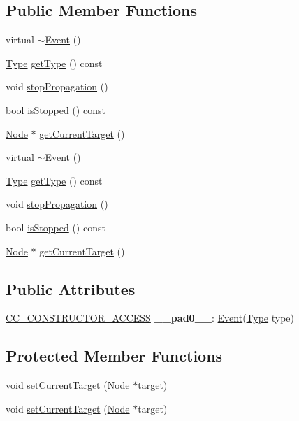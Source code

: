 \subsection*{Public Member Functions}
\begin{DoxyCompactItemize}
\item 
virtual \hyperlink{classEvent_a7704ec01ce91e673885792054214b3d2}{$\sim$\+Event} ()
\item 
\hyperlink{classEvent_a2abf13b5be49315e9e362af02029f058}{Type} \hyperlink{classEvent_af9d60aed1623a8e4d5e673b3f102dfc3}{get\+Type} () const
\item 
void \hyperlink{classEvent_a69732f24bfeabbef113cf128e81ed27f}{stop\+Propagation} ()
\item 
bool \hyperlink{classEvent_a48334dfff0921eb7cddeb15ad1a2c7b6}{is\+Stopped} () const
\item 
\hyperlink{classNode}{Node} $\ast$ \hyperlink{classEvent_a10651de3003e2762867b80b5f2db6fa1}{get\+Current\+Target} ()
\item 
virtual \hyperlink{classEvent_ab864fd85c758006c42cd7a1b3369b483}{$\sim$\+Event} ()
\item 
\hyperlink{classEvent_a2abf13b5be49315e9e362af02029f058}{Type} \hyperlink{classEvent_af9d60aed1623a8e4d5e673b3f102dfc3}{get\+Type} () const
\item 
void \hyperlink{classEvent_a69732f24bfeabbef113cf128e81ed27f}{stop\+Propagation} ()
\item 
bool \hyperlink{classEvent_a48334dfff0921eb7cddeb15ad1a2c7b6}{is\+Stopped} () const
\item 
\hyperlink{classNode}{Node} $\ast$ \hyperlink{classEvent_a10651de3003e2762867b80b5f2db6fa1}{get\+Current\+Target} ()
\end{DoxyCompactItemize}
\subsection*{Public Attributes}
\begin{DoxyCompactItemize}
\item 
\mbox{\label{classEvent_aa503893377e35669354de3c5a0a2b420}} 
\hyperlink{_2cocos2d_2cocos_2base_2ccConfig_8h_a25ef1314f97c35a2ed3d029b0ead6da0}{C\+C\+\_\+\+C\+O\+N\+S\+T\+R\+U\+C\+T\+O\+R\+\_\+\+A\+C\+C\+E\+SS} {\bfseries \+\_\+\+\_\+pad0\+\_\+\+\_\+}\+: \hyperlink{classEvent}{Event}(\hyperlink{classEvent_a2abf13b5be49315e9e362af02029f058}{Type} type)
\end{DoxyCompactItemize}
\subsection*{Protected Member Functions}
\begin{DoxyCompactItemize}
\item 
void \hyperlink{classEvent_a60e1b57b9a97d67300a553205814ccf0}{set\+Current\+Target} (\hyperlink{classNode}{Node} $\ast$target)
\item 
void \hyperlink{classEvent_a60e1b57b9a97d67300a553205814ccf0}{set\+Current\+Target} (\hyperlink{classNode}{Node} $\ast$target)
\end{DoxyCompactItemize}
